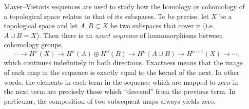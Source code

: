 Mayer--Vietoris sequences are used to study how the homology or cohomology of a topological space relates to that of its subspaces. To be precise, let $X$ be a topological space and let $A,B\subset X$ be two subspaces that cover it (i.e.\ $A\cup B = X$). Then there is an \emph{exact sequence} of homomorphisms between cohomology groups,
\begin{equation*}
	\cdots \to H^n(X) \to H^n(A)\oplus H^n(B) \to H^n(A\cup B) \to H^{n+1}(X) \to \cdots,
\end{equation*}
which continues indefinitely in both directions. Exactness means that the image of each map in the sequence is exactly equal to the kernel of the next. In other words, the elements in each term in the sequence which are mapped to zero in the next term are precisely those which ``descend'' from the previous term. In particular, the composition of two subsequent maps always yields zero.

